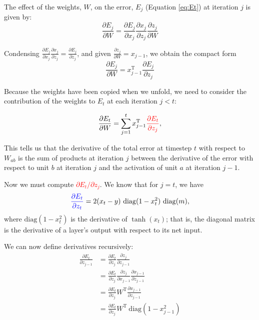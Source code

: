\documentclass[11pt,letterpaper]{article}
\newcommand{\T}{{\ensuremath{\mathrm{T}}}}
\newcommand{\diag}{{\ensuremath{\mathrm{diag}}}}
\theoremstyle{definition}
\newcommand{\highlight}[2]{\textcolor{#1}{#2}}
\begin{document}
The effect of the weights, $W$, on the error, $E_j$ (Equation \ref{eq:Et}) at iteration $j$ is given by:
\[
\frac{\partial E_j}{\partial W} 
= \frac{\partial E_j}{\partial x_j} \frac{\partial x_j}{\partial z_j} \frac{\partial z_j}{\partial W}  
\]

Condensing $\frac{\partial E_j}{\partial x_j} \frac{\partial x_j}{\partial z_j} = \frac{\partial E_j}{\partial z_j}$, and given $\frac{\partial z_j}{\partial W} = x_{j-1}$, we obtain the compact form
\[
\frac{\partial E_j}{\partial W} 
= x_{j-1}^{\T} \frac{\partial E_j}{\partial z_j} 
\]

Because the weights have been copied when we unfold, we need to consider
the contribution of the weights to $E_t$ at each iteration $j<t$:

\begin{equation}
\frac{\partial E_t}{\partial W}
= \sum_{j=1}^t x^{\T}_{j-1}  \highlight{red}{\frac{\partial E_t}{\partial z_j}} 
,
\label{eq:dedw}
\end{equation}

This tells us that the derivative of the total error at timestep $t$ with respect to $W_{ab}$ is the sum of products at iteration $j$ between the derivative of the error with respect to unit $b$ at iteration $j$ and the activation of unit $a$ at iteration $j-1$. 

Now we must compute \highlight{red}{$\partial E_t / \partial z_j$}. We know that
for $j=t$, we have
\begin{equation}
\highlight{blue}{\frac{\partial E_t}{\partial z_t}} = 2 (x_t - y) ~\diag (1 - x_t^2) ~\diag(m),
\label{eq:dedzt}
\end{equation}
where $\diag (1 - x_t^2)$ is the derivative of $\tanh (x_t)$; that is, the diagonal matrix is the derivative of a layer's output with respect to its net input. 

We can now define derivatives recursively:
\begin{align*}
\frac{\partial E_t}{\partial z_{j-1}}  &= \frac{\partial E_t}{\partial z_j}  \frac{\partial z_j}{\partial z_{j-1}} \\
  & = \frac{\partial E_t}{\partial z_j}  \frac{\partial z_j}{\partial x_{j-1}} \frac{\partial x_{j-1}}{\partial z_{j-1}} \\
  & = \frac{\partial E_t}{\partial z_j} W^{\T} \frac{\partial x_{j-1}}{\partial z_{j-1}} \\
  & = \frac{\partial E_t}{\partial z_j} W^{\T} ~\diag(1-x_{j-1}^2) \\
\end{align*}
\end{document}
